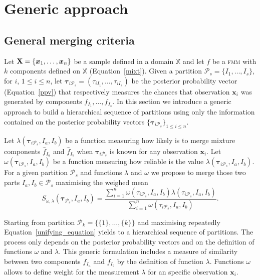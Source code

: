\documentclass[submit]{smj}
\theoremstyle{definition}
\newcommand{\m}[1]{\boldsymbol{#1}}
\newcommand{\fmm}{\textsc{fmm}\xspace}
\begin{document}
\section{Generic approach}\label{generic_merging}

\subsection{General merging criteria}\label{merging_criteria}

Let $\text{\textbf{X}} = \{\m x_1,\dots,\m x_n \}$ be a sample defined in  a domain $\mathbb{X}$ and let $f$ be a \fmm with $k$ components defined on $\mathbb{X}$ (Equation~\ref{mixt}). Given a partition $\mathcal{P}_s = \{I_1, \dots, I_s\}$, for $i$, $1\leq i \leq n $, let $\m\tau_{i \mathcal{P}_s}= \left( \tau_{i I_1} , \dots, \tau_{i I_s}  \right)$ be the posterior probability vector (Equation~\ref{ppv}) that respectively measures the chances that observation $\m x_i$ was generated by components $f_{I_1}, \dots, f_{I_s}$. In this section we introduce a generic approach to build a hierarchical sequence of partitions using only the information contained on the posterior probability vectors $\{\m\tau_{i \mathcal{P}_s}\}_{1\leq i \leq n}$.


Let $\lambda(\m\tau_{i \mathcal{P}_s},  I_a,  I_b)$ be a function measuring how likely is to merge mixture components $\hat{f}_{I_a}$ and $\hat{f}_{I_b}$ when $\m \tau_{i \mathcal{P}_s}$ is known for any observation $\m x_i$. Let $\omega(\m\tau_{i \mathcal{P}_s},  I_a,  I_b)$ be a function measuring how reliable is the value $\lambda(\m\tau_{i \mathcal{P}_s},  I_a,  I_b)$.  For a given partition $\mathcal{P}_s$ and functions $\lambda$ and $\omega$ we propose to merge those two parts $I_a, I_b \in \mathcal{P}_s$ maximising the weighed mean
\begin{equation}\label{unifying_equation}
S_{\omega, \lambda}( \m\tau_{\mathcal{P}_s},  I_a,  I_b) = \frac{\sum_{i=1}^n \omega(\tau_{i \mathcal{P}_s}, I_a, I_b) \lambda(\tau_{i \mathcal{P}_s}, I_a, I_b)}{\sum_{i=1}^n \omega(\tau_{i \mathcal{P}_s}, I_a, I_b) }.
\end{equation}


Starting from partition $\mathcal{P}_k = \{ \{1\}, \dots, \{k\} \}$ and maximising repeatedly Equation~\ref{unifying_equation} yields to a hierarchical sequence of partitions. The process only depends on the posterior probability vectors and on the definition of functions $\omega$ and $\lambda$. This generic formulation includes a measure of similarity between two components $f_{I_a}$ and $f_{I_b}$ by the definition of function $\lambda$. Functions $\omega$ allows to define weight for the measurement $\lambda$ for an specific observation $\m x_i$.
\end{document}
